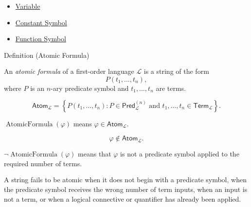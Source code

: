 \begin{dependencies}
\begin{itemize}
  \item \hyperref[def:variable]{Variable}
  \item \hyperref[def:constant-symbol]{Constant Symbol}
  \item \hyperref[def:function-symbol]{Function Symbol}
\end{itemize}
\end{dependencies}

\begin{definitionbox}{Definition (Atomic Formula)}
\begin{definition}
\label{def:atomic-formula}
An \emph{atomic formula} of a first-order language \(\mathcal L\) is a string
of the form
\[
P(t_1,\ldots,t_n),
\]
where \(P\) is an \(n\)-ary predicate symbol and
\(t_1,\ldots,t_n\) are terms.
\end{definition}
\end{definitionbox}

\begin{remark*}
\[
\mathsf{Atom}_{\mathcal L}
=
\left\{
P(t_1,\ldots,t_n):
P\in\mathsf{Pred}_{\mathcal L}^{(n)}
\text{ and }
t_1,\ldots,t_n\in\mathsf{Term}_{\mathcal L}
\right\}.
\]
\end{remark*}

\begin{remark*}
\(\operatorname{AtomicFormula}(\varphi)\) means
\(\varphi\in\mathsf{Atom}_{\mathcal L}\).
\end{remark*}

\begin{remark*}
\[
\varphi\notin\mathsf{Atom}_{\mathcal L}.
\]
\end{remark*}

\begin{remark*}
\(\neg\operatorname{AtomicFormula}(\varphi)\) means that \(\varphi\) is not a
predicate symbol applied to the required number of terms.
\end{remark*}

\begin{remark*}
A string fails to be atomic when it does not begin with a predicate symbol,
when the predicate symbol receives the wrong number of term inputs, when an
input is not a term, or when a logical connective or quantifier has already
been applied.
\end{remark*}

